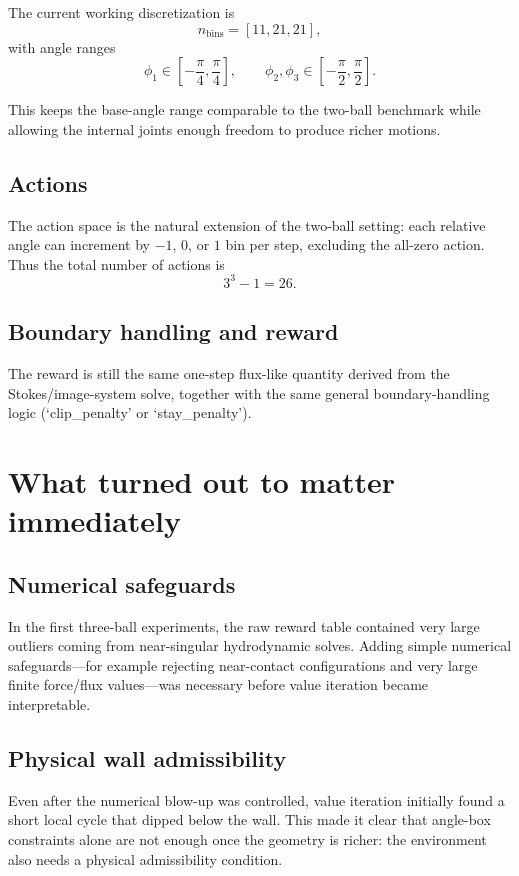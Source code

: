 \documentclass{article}
\begin{document}
The current working discretization is
\[
n_{\mathrm{bins}} = [11,21,21],
\]
with angle ranges
\[
\phi_1 \in \left[-\frac{\pi}{4},\frac{\pi}{4}\right],\qquad
\phi_2,\phi_3 \in \left[-\frac{\pi}{2},\frac{\pi}{2}\right].
\]

This keeps the base-angle range comparable to the two-ball benchmark while allowing the internal joints enough freedom to produce richer motions.

\subsection*{Actions}

The action space is the natural extension of the two-ball setting: each relative angle can increment by $-1$, $0$, or $1$ bin per step, excluding the all-zero action. Thus the total number of actions is
\[
3^3-1=26.
\]

\subsection*{Boundary handling and reward}

The reward is still the same one-step flux-like quantity derived from the Stokes/image-system solve, together with the same general boundary-handling logic (`clip\_penalty' or `stay\_penalty').

\section{What turned out to matter immediately}

\subsection*{Numerical safeguards}

In the first three-ball experiments, the raw reward table contained very large outliers coming from near-singular hydrodynamic solves. Adding simple numerical safeguards---for example rejecting near-contact configurations and very large finite force/flux values---was necessary before value iteration became interpretable.

\subsection*{Physical wall admissibility}

Even after the numerical blow-up was controlled, value iteration initially found a short local cycle that dipped below the wall. This made it clear that angle-box constraints alone are not enough once the geometry is richer: the environment also needs a physical admissibility condition.
\end{document}

